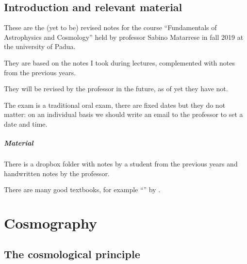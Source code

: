 \documentclass[main.tex]{subfiles}
\begin{document}
\section*{Introduction and relevant material}

These are the
(yet to be)
revised notes for the course ``Fundamentals of Astrophysics and Cosmology'' held by professor Sabino Matarrese in fall 2019 at the university of Padua.

They are based on the notes I took during lectures, complemented with notes from the previous years.

They will be revised by the professor in the future, as of yet they have not.

The exam is a traditional oral exam, there are fixed dates but they do not matter: on an individual basis we should write an email to the professor to set a date and time.

\paragraph{Material}

There is a dropbox folder with notes by a student from the previous years \cite[]{paccianiAppuntiCorsoPhysical2018} and handwritten notes by the professor.

There are many good textbooks, for example ``'' by \citeauthor{colespCosmology2002} \cite[]{colespCosmology2002}.





\chapter{Cosmography}


\section{The cosmological principle}
\end{document}
